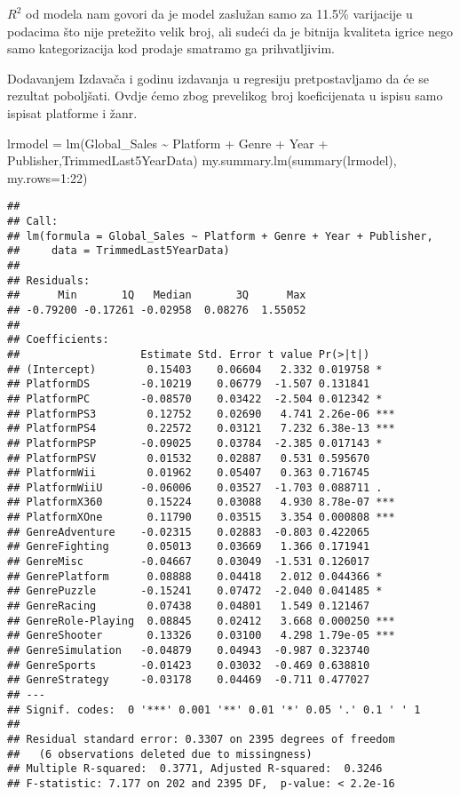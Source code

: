 \documentclass[
]{article}
\newenvironment{Shaded}{\begin{snugshade}}{\end{snugshade}}
\newcommand{\AttributeTok}[1]{\textcolor[rgb]{0.77,0.63,0.00}{#1}}
\newcommand{\DecValTok}[1]{\textcolor[rgb]{0.00,0.00,0.81}{#1}}
\newcommand{\FunctionTok}[1]{\textcolor[rgb]{0.00,0.00,0.00}{#1}}
\newcommand{\NormalTok}[1]{#1}
\newcommand{\OtherTok}[1]{\textcolor[rgb]{0.56,0.35,0.01}{#1}}
\newcommand{\SpecialCharTok}[1]{\textcolor[rgb]{0.00,0.00,0.00}{#1}}
\begin{document}
\(R^2\) od modela nam govori da je model zaslužan samo za 11.5\%
varijacije u podacima što nije pretežito velik broj, ali sudeći da je
bitnija kvaliteta igrice nego samo kategorizacija kod prodaje smatramo
ga prihvatljivim.

Dodavanjem Izdavača i godinu izdavanja u regresiju pretpostavljamo da će
se rezultat poboljšati. Ovdje ćemo zbog prevelikog broj koeficijenata u
ispisu samo ispisat platforme i žanr.

\begin{Shaded}
\begin{Highlighting}[]
\NormalTok{lrmodel }\OtherTok{=} \FunctionTok{lm}\NormalTok{(Global\_Sales }\SpecialCharTok{\textasciitilde{}}\NormalTok{ Platform }\SpecialCharTok{+}\NormalTok{ Genre }\SpecialCharTok{+}\NormalTok{ Year }\SpecialCharTok{+}\NormalTok{ Publisher,TrimmedLast5YearData)}
\FunctionTok{my.summary.lm}\NormalTok{(}\FunctionTok{summary}\NormalTok{(lrmodel), }\AttributeTok{my.rows=}\DecValTok{1}\SpecialCharTok{:}\DecValTok{22}\NormalTok{)}
\end{Highlighting}
\end{Shaded}

\begin{verbatim}
## 
## Call:
## lm(formula = Global_Sales ~ Platform + Genre + Year + Publisher, 
##     data = TrimmedLast5YearData)
## 
## Residuals:
##      Min       1Q   Median       3Q      Max 
## -0.79200 -0.17261 -0.02958  0.08276  1.55052 
## 
## Coefficients:
##                   Estimate Std. Error t value Pr(>|t|)    
## (Intercept)        0.15403    0.06604   2.332 0.019758 *  
## PlatformDS        -0.10219    0.06779  -1.507 0.131841    
## PlatformPC        -0.08570    0.03422  -2.504 0.012342 *  
## PlatformPS3        0.12752    0.02690   4.741 2.26e-06 ***
## PlatformPS4        0.22572    0.03121   7.232 6.38e-13 ***
## PlatformPSP       -0.09025    0.03784  -2.385 0.017143 *  
## PlatformPSV        0.01532    0.02887   0.531 0.595670    
## PlatformWii        0.01962    0.05407   0.363 0.716745    
## PlatformWiiU      -0.06006    0.03527  -1.703 0.088711 .  
## PlatformX360       0.15224    0.03088   4.930 8.78e-07 ***
## PlatformXOne       0.11790    0.03515   3.354 0.000808 ***
## GenreAdventure    -0.02315    0.02883  -0.803 0.422065    
## GenreFighting      0.05013    0.03669   1.366 0.171941    
## GenreMisc         -0.04667    0.03049  -1.531 0.126017    
## GenrePlatform      0.08888    0.04418   2.012 0.044366 *  
## GenrePuzzle       -0.15241    0.07472  -2.040 0.041485 *  
## GenreRacing        0.07438    0.04801   1.549 0.121467    
## GenreRole-Playing  0.08845    0.02412   3.668 0.000250 ***
## GenreShooter       0.13326    0.03100   4.298 1.79e-05 ***
## GenreSimulation   -0.04879    0.04943  -0.987 0.323740    
## GenreSports       -0.01423    0.03032  -0.469 0.638810    
## GenreStrategy     -0.03178    0.04469  -0.711 0.477027    
## ---
## Signif. codes:  0 '***' 0.001 '**' 0.01 '*' 0.05 '.' 0.1 ' ' 1
## 
## Residual standard error: 0.3307 on 2395 degrees of freedom
##   (6 observations deleted due to missingness)
## Multiple R-squared:  0.3771, Adjusted R-squared:  0.3246 
## F-statistic: 7.177 on 202 and 2395 DF,  p-value: < 2.2e-16
\end{verbatim}
\end{document}

